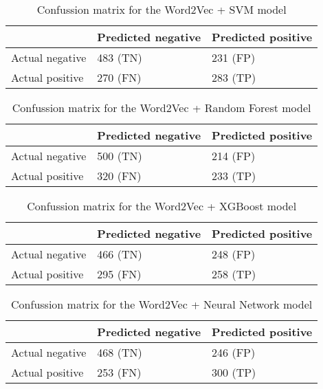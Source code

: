 \begin{table}[!htbp]
\centering
{
\makegapedcells
\begin{tabular}{lll}
                & Predicted negative & Predicted positive \\
\hline
Actual negative & 483 (TN)           & 231 (FP) \\
Actual positive & 270 (FN)           & 283 (TP) \\
\hline
\end{tabular}
}
\caption{Confussion matrix for the Word2Vec + SVM model}
\label{w2vsvm_cm}
\end{table}

\begin{table}[!htbp]
\centering
{
\makegapedcells
\begin{tabular}{lll}
                & Predicted negative & Predicted positive \\
\hline
Actual negative & 500 (TN)           & 214 (FP) \\
Actual positive & 320 (FN)           & 233 (TP) \\
\hline
\end{tabular}
}
\caption{Confussion matrix for the Word2Vec + Random Forest model}
\label{w2vrf_cm}
\end{table}

\begin{table}[!htbp]
\centering
{
\makegapedcells
\begin{tabular}{lll}
                & Predicted negative & Predicted positive \\
\hline
Actual negative & 466 (TN)           & 248 (FP) \\
Actual positive & 295 (FN)           & 258 (TP) \\
\hline
\end{tabular}
}
\caption{Confussion matrix for the Word2Vec + XGBoost model}
\label{w2vxgb_cm}
\end{table}

\begin{table}[!htbp]
\centering
{
\makegapedcells
\begin{tabular}{lll}
                & Predicted negative & Predicted positive \\
\hline
Actual negative & 468 (TN)           & 246 (FP) \\
Actual positive & 253 (FN)           & 300 (TP) \\
\hline
\end{tabular}
}
\caption{Confussion matrix for the Word2Vec + Neural Network model}
\label{w2vnn_cm}
\end{table}


